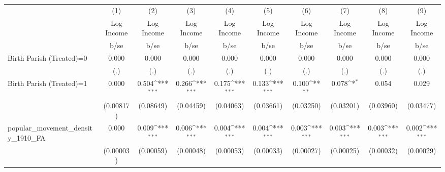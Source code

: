 {
\def\sym#1{\ifmmode^{#1}\else\(^{#1}\)\fi}
\begin{tabular}{l*{9}{c}}
\hline\hline
                    &\multicolumn{1}{c}{(1)}&\multicolumn{1}{c}{(2)}&\multicolumn{1}{c}{(3)}&\multicolumn{1}{c}{(4)}&\multicolumn{1}{c}{(5)}&\multicolumn{1}{c}{(6)}&\multicolumn{1}{c}{(7)}&\multicolumn{1}{c}{(8)}&\multicolumn{1}{c}{(9)}\\
                    &\multicolumn{1}{c}{Log Income}&\multicolumn{1}{c}{Log Income}&\multicolumn{1}{c}{Log Income}&\multicolumn{1}{c}{Log Income}&\multicolumn{1}{c}{Log Income}&\multicolumn{1}{c}{Log Income}&\multicolumn{1}{c}{Log Income}&\multicolumn{1}{c}{Log Income}&\multicolumn{1}{c}{Log Income}\\
                    &        b/se         &        b/se         &        b/se         &        b/se         &        b/se         &        b/se         &        b/se         &        b/se         &        b/se         \\
\hline
Birth Parish (Treated)=0&       0.000         &       0.000         &       0.000         &       0.000         &       0.000         &       0.000         &       0.000         &       0.000         &       0.000         \\
                    &         (.)         &         (.)         &         (.)         &         (.)         &         (.)         &         (.)         &         (.)         &         (.)         &         (.)         \\
Birth Parish (Treated)=1&       0.000         &       0.504\sym{***}&       0.266\sym{***}&       0.175\sym{***}&       0.133\sym{***}&       0.100\sym{**} &       0.078\sym{*}  &       0.054         &       0.029         \\
                    &   (0.00817)         &   (0.08649)         &   (0.04459)         &   (0.04063)         &   (0.03661)         &   (0.03250)         &   (0.03201)         &   (0.03960)         &   (0.03477)         \\
popular\_movement\_density\_1910\_FA&       0.000         &       0.009\sym{***}&       0.006\sym{***}&       0.004\sym{***}&       0.004\sym{***}&       0.003\sym{***}&       0.003\sym{***}&       0.003\sym{***}&       0.002\sym{***}\\
                    &   (0.00003)         &   (0.00059)         &   (0.00048)         &   (0.00053)         &   (0.00033)         &   (0.00027)         &   (0.00025)         &   (0.00032)         &   (0.00029)         \\

\end{tabular}}
